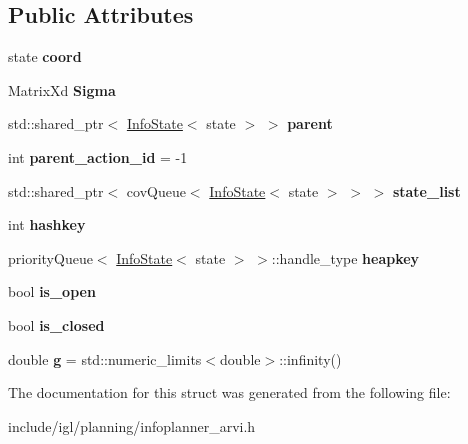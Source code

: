 \subsection*{Public Attributes}
\begin{DoxyCompactItemize}
\item 
\mbox{\label{structnx_1_1InfoState_ac6e29a26329144f47969526f6a08a118}} 
state {\bfseries coord}
\item 
\mbox{\label{structnx_1_1InfoState_acbfbc2861af72e1ed79fbda6b7bed7b6}} 
Matrix\+Xd {\bfseries Sigma}
\item 
\mbox{\label{structnx_1_1InfoState_af5517b6744d3a95bb31bb3089da2b8ab}} 
std\+::shared\+\_\+ptr$<$ \hyperlink{structnx_1_1InfoState}{Info\+State}$<$ state $>$ $>$ {\bfseries parent}
\item 
\mbox{\label{structnx_1_1InfoState_a627fff266fc2bebc073e894edad47c59}} 
int {\bfseries parent\+\_\+action\+\_\+id} = -\/1
\item 
\mbox{\label{structnx_1_1InfoState_a4c7fb56d1594eab1df9dc522cee40dcb}} 
std\+::shared\+\_\+ptr$<$ cov\+Queue$<$ \hyperlink{structnx_1_1InfoState}{Info\+State}$<$ state $>$ $>$ $>$ {\bfseries state\+\_\+list}
\item 
\mbox{\label{structnx_1_1InfoState_ad3cb2778af2b9ccd035d5ba81700fa83}} 
int {\bfseries hashkey}
\item 
\mbox{\label{structnx_1_1InfoState_a4ef804a1e1e92344d8779d3d20b00ca0}} 
priority\+Queue$<$ \hyperlink{structnx_1_1InfoState}{Info\+State}$<$ state $>$ $>$\+::handle\+\_\+type {\bfseries heapkey}
\item 
\mbox{\label{structnx_1_1InfoState_a625332147ae8ad23406ada2afec7ec7d}} 
bool {\bfseries is\+\_\+open}
\item 
\mbox{\label{structnx_1_1InfoState_a645cec83d8a2b212de7613a0835b2cca}} 
bool {\bfseries is\+\_\+closed}
\item 
\mbox{\label{structnx_1_1InfoState_aa2386d61df97eaa59d2d560f67b1cc5d}} 
double {\bfseries g} = std\+::numeric\+\_\+limits$<$double$>$\+::infinity()
\end{DoxyCompactItemize}


The documentation for this struct was generated from the following file\+:\begin{DoxyCompactItemize}
\item 
include/igl/planning/infoplanner\+\_\+arvi.\+h\end{DoxyCompactItemize}
